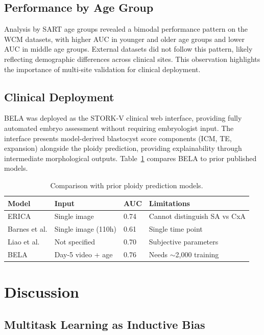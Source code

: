 \documentclass[11pt]{article}
\begin{document}
\subsection{Performance by Age Group}

Analysis by SART age groups revealed a bimodal performance pattern on the WCM datasets, with higher AUC in younger and older age groups and lower AUC in middle age groups. External datasets did not follow this pattern, likely reflecting demographic differences across clinical sites. This observation highlights the importance of multi-site validation for clinical deployment.

\subsection{Clinical Deployment}

BELA was deployed as the STORK-V clinical web interface, providing fully automated embryo assessment without requiring embryologist input. The interface presents model-derived blastocyst score components (ICM, TE, expansion) alongside the ploidy prediction, providing explainability through intermediate morphological outputs. Table~\ref{tab:comparison} compares BELA to prior published models.

\begin{table}[htbp]
\centering
\caption{Comparison with prior ploidy prediction models.}
\label{tab:comparison}
\begin{tabular}{llll}
\toprule
Model & Input & AUC & Limitations \\
\midrule
ERICA & Single image & 0.74 & Cannot distinguish SA vs CxA \\
Barnes et al. & Single image (110h) & 0.61 & Single time point \\
Liao et al. & Not specified & 0.70 & Subjective parameters \\
BELA & Day-5 video + age & 0.76 & Needs $\sim$2,000 training \\
\bottomrule
\end{tabular}
\end{table}

\section{Discussion}

\subsection{Multitask Learning as Inductive Bias}
\end{document}
